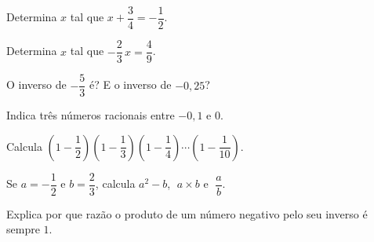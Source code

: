\documentclass[12pt]{article}
\begin{document}
\begin{exercicios}
  \item Determina $x$ tal que $x + \dfrac{3}{4} = -\dfrac{1}{2}$.
  \item Determina $x$ tal que $-\dfrac{2}{3}\,x = \dfrac{4}{9}$.
  \item O inverso de $-\dfrac{5}{3}$ é? E o inverso de $-0{,}25$?
  \item Indica três números racionais entre $-0{,}1$ e $0$.
  \item Calcula $\left(1 - \dfrac{1}{2}\right)\left(1 - \dfrac{1}{3}\right)\left(1 - \dfrac{1}{4}\right)\cdots\left(1 - \dfrac{1}{10}\right)$.
  \item Se $a = -\dfrac{1}{2}$ e $b = \dfrac{2}{3}$, calcula $a^2 - b$, $\;a \times b$ e $\;\dfrac{a}{b}$.
  \item Explica por que razão o produto de um número negativo pelo seu inverso é sempre $1$.
\end{exercicios}
\end{document}
